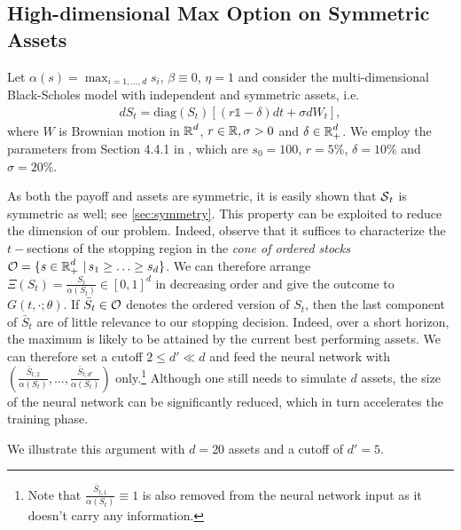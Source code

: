 \subsection{High-dimensional Max Option on Symmetric Assets}\label{sec:maxCallSym}
Let $\alpha(s) = \max_{i=1,...,d}s_i$, $\beta\equiv 0$, $\eta=1$ and consider the multi-dimensional Black-Scholes model with independent and symmetric assets, i.e. 
\begin{align}\label{eq:BSAsym}
    d S_t = \text{diag}(S_t) \left[ (r\mathds{1} - \delta)dt + \sigma dW_t\right],
\end{align}
where $W$ is Brownian motion in $\operatorname{\mathbb{R}}^d$, $r \in \operatorname{\mathbb{R}} ,\sigma > 0$ and $\delta \in \operatorname{\mathbb{R}}_+^d$. We employ the parameters from Section 4.4.1 in \cite{Becker2}, which are $s_0 =100 $, $r=5\%$, $\delta =10\%$ and $\sigma = 20 \%$. 

As both the payoff and assets are symmetric, it is easily shown that  $\operatorname{\mathcal{S}}_t$ is symmetric as well; see \cref{sec:symmetry}. This property can be exploited to reduce the dimension of our problem. Indeed, observe that it suffices to characterize the $t-$sections of the stopping region in the \textit{cone of ordered stocks}  
 $\operatorname{\mathcal{O}} = \{s\in \operatorname{\mathbb{R}}_+^d \,|\, s_1 \geq \ldots \geq s_d\}$. We can therefore arrange $\Xi(S_t) = \frac{S_t}{\alpha(S_t)}\in [0,1]^d$ in decreasing order and give the outcome to $G(t,\cdot; \theta)$. If $\bar{S}_t \in \operatorname{\mathcal{O}}$ denotes the ordered version of $S_t$, then the last component of $\bar{S}_t$ are of little relevance to our stopping decision. 
 Indeed, over a short horizon, the maximum is  likely to be attained by the current best performing assets. %
 We can therefore set a cutoff $2 \le d' \ll d$ and feed the neural network with $(\frac{\bar{S}_{t,2}}{\alpha(S_t)},\ldots,\frac{\bar{S}_{t,d'}}{\alpha(S_t)})$ only.\footnote{Note that $\frac{\bar{S}_{t,1}}{\alpha(S_t)} \equiv 1$ is also removed from the neural network input as it doesn't carry any information.} Although one still needs to simulate $d$ assets, the size of the neural network can be significantly reduced, which in turn accelerates the training phase.  
 
 We illustrate this argument with $d=20$ assets and a cutoff of $d'=5$. 



